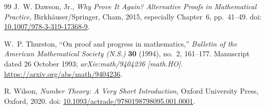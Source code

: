 \documentclass[11pt,a4paper]{article}
\theoremstyle{clockplain}
\theoremstyle{definition}
\theoremstyle{remark}
\begin{document}
\begin{thebibliography}{99}
J.~W. Dawson, Jr.,
\emph{Why Prove It Again? Alternative Proofs in Mathematical Practice},
Birkh\"auser/Springer, Cham, 2015, especially Chapter~6, pp.~41--49.
\newblock doi: \href{https://doi.org/10.1007/978-3-319-17368-9}{10.1007/978-3-319-17368-9}.

W.~P. Thurston,
``On proof and progress in mathematics,''
\emph{Bulletin of the American Mathematical Society (N.S.)}
\textbf{30} (1994), no.~2, 161--177.
\newblock Manuscript dated 26 October 1993; \emph{arXiv:math/9404236 [math.HO]}.
\newblock \url{https://arxiv.org/abs/math/9404236}.

R. Wilson,
\emph{Number Theory: A Very Short Introduction},
Oxford University Press, Oxford, 2020.
\newblock doi: \href{https://doi.org/10.1093/actrade/9780198798095.001.0001}{10.1093/actrade/9780198798095.001.0001}.

\end{thebibliography}
\end{document}

